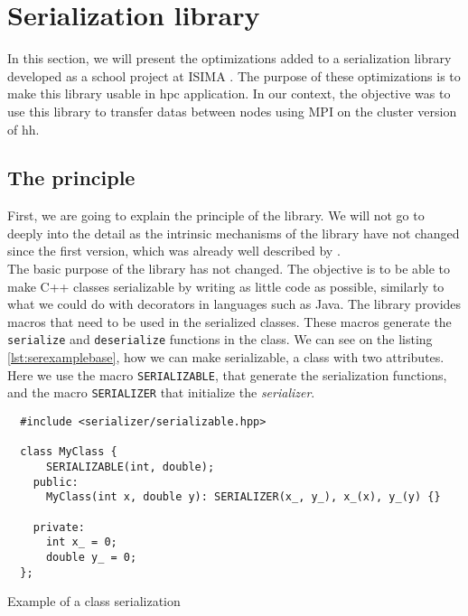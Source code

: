 
\section{Serialization library}

In this section, we will present the optimizations added to a serialization
library developed as a school project at ISIMA \cite{projectzz3isima}. The purpose
of these optimizations is to make this library usable in \gls{hpc} application.
In our context, the objective was to use this library to transfer datas between
nodes using MPI on the cluster version of \gls{hh}.

\subsection{The principle}

First, we are going to explain the principle of the library. We will not go to
deeply into the detail as the intrinsic mechanisms of the library have not changed
since the first version, which was already well described by
\cite{projectzz3isima}.\\

The basic purpose of the library has not changed. The objective is to be able to
make C++ classes serializable by writing as little code as possible, similarly
to what we could do with decorators in languages such as Java. The library
provides macros that need to be used in the serialized classes. These macros
generate the \texttt{serialize} and \texttt{deserialize} functions in the class.
We can see on the listing \ref{lst:serexamplebase}, how we can make
serializable, a class with two attributes. Here we use the macro
\texttt{SERIALIZABLE}, that generate the serialization functions, and the macro
\texttt{SERIALIZER} that initialize the \textit{serializer}.

\begin{listing}[ht!]
\begin{verbatim}
  #include <serializer/serializable.hpp>

  class MyClass {
      SERIALIZABLE(int, double);
    public:
      MyClass(int x, double y): SERIALIZER(x_, y_), x_(x), y_(y) {}

    private:
      int x_ = 0;
      double y_ = 0;
  };
\end{verbatim}
\caption{Example of a class serialization}
\label{lst:serexamplebase}
\end{listing}

